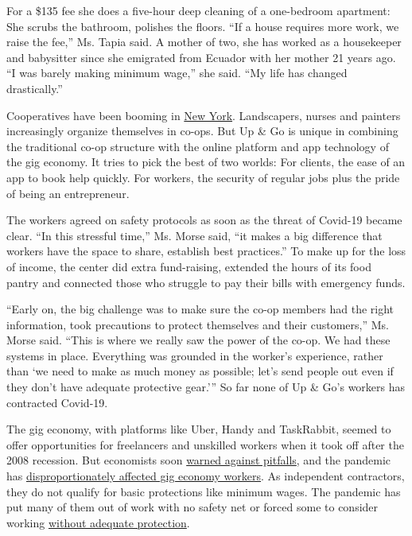 For a \$135 fee she does a five-hour deep cleaning of a one-bedroom
apartment: She scrubs the bathroom, polishes the floors. ``If a house
requires more work, we raise the fee,'' Ms. Tapia said. A mother of two,
she has worked as a housekeeper and babysitter since she emigrated from
Ecuador with her mother 21 years ago. ``I was barely making minimum
wage,'' she said. ``My life has changed drastically.''

Cooperatives have been booming in
\href{https://www1.nyc.gov/nycbusiness/article/worker-cooperatives}{New
York}. Landscapers, nurses and painters increasingly organize themselves
in co-ops. But Up \& Go is unique in combining the traditional co-op
structure with the online platform and app technology of the gig
economy. It tries to pick the best of two worlds: For clients, the ease
of an app to book help quickly. For workers, the security of regular
jobs plus the pride of being an entrepreneur.

The workers agreed on safety protocols as soon as the threat of Covid-19
became clear. ``In this stressful time,'' Ms. Morse said, ``it makes a
big difference that workers have the space to share, establish best
practices.'' To make up for the loss of income, the center did extra
fund-raising, extended the hours of its food pantry and connected those
who struggle to pay their bills with emergency funds.

``Early on, the big challenge was to make sure the co-op members had the
right information, took precautions to protect themselves and their
customers,'' Ms. Morse said. ``This is where we really saw the power of
the co-op. We had these systems in place. Everything was grounded in the
worker's experience, rather than `we need to make as much money as
possible; let's send people out even if they don't have adequate
protective gear.''' So far none of Up \& Go's workers has contracted
Covid-19.

The gig economy, with platforms like Uber, Handy and TaskRabbit, seemed
to offer opportunities for freelancers and unskilled workers when it
took off after the 2008 recession. But economists soon
\href{https://www.nytimes3xbfgragh.onion/2017/04/10/opinion/the-gig-economys-false-promise.html?searchResultPosition=1}{warned
against pitfalls}, and the pandemic has
\href{https://www.nytimes3xbfgragh.onion/2020/03/18/technology/gig-economy-pandemic.html}{disproportionately
affected gig economy workers}. As independent contractors, they do not
qualify for basic protections like minimum wages. The pandemic has put
many of them out of work with no safety net or forced some to consider
working
\href{https://www.nytimes3xbfgragh.onion/2020/03/30/business/economy/coronavirus-instacart-amazon.html}{without
adequate protection}.

